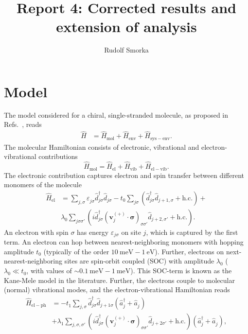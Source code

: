 \documentclass{article}
\renewcommand{\vec}[1]{\mathbf{#1}}
\newcommand{\pdagger}{{\phantom{\dagger}}}
\begin{document}
	
\title{Report 4: Corrected results and extension of analysis}
\author{Rudolf Smorka}
\maketitle
\tableofcontents
\newpage
\section{Model}
The model considered for a chiral, single-stranded molecule, as proposed in Refs.~\cite{fransson2019chirality,fransson2020vibrational,Fransson_2021,fransson2021charge}, reads
\begin{align}
	\hat{H} &= \hat{H}_\mathrm{mol} + \hat{H}_\mathrm{env} + \hat{H}_\mathrm{sys-env}.
\end{align} 
The molecular Hamiltonian consists of electronic, vibrational and electron-vibrational contributions 
\begin{equation}
	\hat{H}_\mathrm{mol} = \hat{H}_\mathrm{el}  + \hat{H}_\mathrm{vib} + \hat{H}_\mathrm{el-vib}.
\end{equation}
The electronic contribution captures electron and spin transfer between different monomers of the molecule
\begin{equation}
	\begin{split}
		\hat{H}_\mathrm{el} &= \sum_{j,\sigma} \varepsilon_{j\sigma}^\pdagger \hat{d}_{j\sigma}^\dagger \hat{d}_{j\sigma}^\pdagger - t_0 \sum_{j\sigma} (\hat{d}_{j\sigma}^\dagger \hat{d}_{j+1,\sigma}^\pdagger + \mathrm{h.c.}) +\\& \lambda_0^\pdagger\sum_{j\sigma\sigma'} (i\hat{d}_{j\sigma}^\dagger (\vec{v}_j^{(+)}\cdot \bm{\sigma})_{\sigma\sigma'}^\pdagger \hat{d}_{j+2,\sigma'}^\pdagger + \mathrm{h.c.}).
	\end{split}
\end{equation}
An electron with spin $\sigma$ has energy $\varepsilon_{j\sigma}$ on site $j$, which is captured by the first term. An electron can hop between nearest-neighboring monomers with hopping amplitude $t_0$ (typically of the order $\SI{10}{\milli\electronvolt}-\SI{1}{\electronvolt}$). Further, electrons on next-nearest-neighboring sites are spin-orbit coupled (SOC) with amplitude $\lambda_0$ ($\lambda_0 \ll t_0$, with values of $\sim \SI{0.1}{\milli\electronvolt}-\SI{1}{\milli\electronvolt}$). This SOC-term is known as the  Kane-Mele model in the literature.
Further, the electrons couple to molecular (normal) vibrational modes, and the electron-vibrational Hamiltonian reads 
\begin{align}
	\hat{H}_\mathrm{el-ph} &= - t_1^\pdagger \sum_{j,\sigma}  \hat{d}_{j\sigma}^\dagger \hat{d}_{j+1\sigma}^\pdagger (\hat{a}_{j}^\dagger + \hat{a}_{j}^\pdagger) \\ & + \lambda_1^\pdagger\sum_{j,\sigma,\sigma'} (i \hat{d}_{j\sigma}^\dagger (\vec{v}_j^{(+)} \cdot \bm{\sigma})_{\sigma\sigma'}^\pdagger \hat{d}_{j+2\sigma'}^\pdagger +\mathrm{h.c.})(\hat{a}_{j}^\dagger + \hat{a}_{j}^\pdagger),\label{eq:HelPh}
\end{align}
\end{document}
